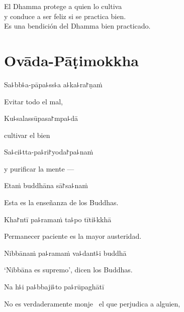 \begin{english}
  El Dhamma protege a quien lo cultiva\\
  y conduce a ser feliz si se practica bien.\\
  Es una bendición del Dhamma bien practicado.
\end{english}

\chapter{Ovāda-Pāṭimokkha}


\enlargethispage{\baselineskip}

\begin{leader}
\end{leader}

Sa꜕bb꜕a-pāpa꜕ss꜕a a꜕ka꜕ra꜓ṇaṁ
	
	\begin{english}
		Evitar todo el mal,
	\end{english}
	
	Ku꜕salassūpasa꜓mpa꜕dā
	
	\begin{english}
		cultivar el bien
	\end{english}
	
	Sa꜕ci꜕tta-pa꜕ri꜓yoda꜓pa꜕naṁ
	
	\begin{english}
		y purificar la mente ---
	\end{english}
	
	Etaṁ buddhāna sā꜓sa꜕naṁ
	
	\begin{english}
		Esta es la enseñanza de los Buddhas.
	\end{english}


Kha꜓ntī pa꜕ramaṁ ta꜕po tīti꜕kkhā

\begin{english}
  Permanecer paciente es la mayor austeridad.
\end{english}

Nibbānaṁ pa꜕ramaṁ va꜕dant꜕i buddhā

\begin{english}
  ‘Nibbāna es supremo’, dicen los Buddhas.
\end{english}

Na h꜕i pa꜕bbaji꜕to pa꜕rūpaghātī

\begin{english}
  No es verdaderamente monje \pause\ el que perjudica a alguien,
\end{english}

